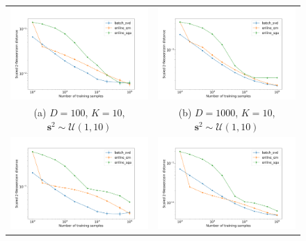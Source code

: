 \documentclass[msc,deptreport.inf]{infthesis} %
\newcommand{\matr}[1]{\mathbf{#1}}
\begin{document}
\begin{figure}[!htbp] 
	\begin{tabular}{cc}
		\includegraphics[width=70mm]{plots/online_fa_wasserstein__observation_dim=100__latent_dim=10__spectrum_min=1__spectrum_max=10.png}
		& \includegraphics[width=70mm]{plots/online_fa_wasserstein__observation_dim=1000__latent_dim=10__spectrum_min=1__spectrum_max=10.png} \\
		(a) $D=100$, $K=10$, $\matr{s}^2 \sim \mathcal{U}(1, 10)$ 
		 & (b) $D=1000$, $K=10$, $\matr{s}^2 \sim \mathcal{U}(1, 10)$\\[6pt] 
		 \includegraphics[width=70mm]{plots/online_fa_wasserstein__observation_dim=100__latent_dim=10__spectrum_min=1__spectrum_max=100.png} 
		 & \includegraphics[width=70mm]{plots/online_fa_wasserstein__observation_dim=1000__latent_dim=10__spectrum_min=1__spectrum_max=100.png} \\

\end{tabular}
\end{figure}
\end{document}
